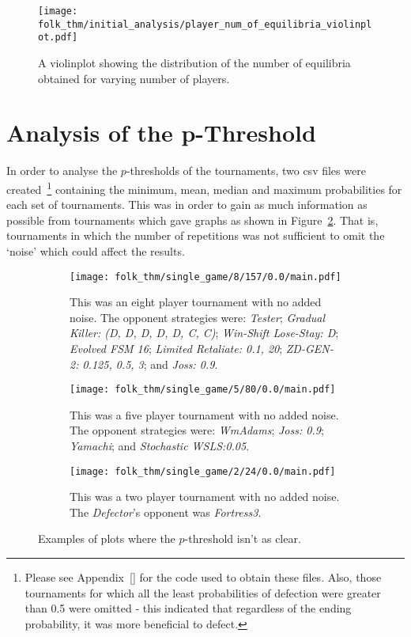 \begin{figure}      
    \centering
    \texttt{[image: folk\_thm/initial\_analysis/player\_num\_of\_equilibria\_violinplot.pdf]}
    \caption{A violinplot showing the distribution of the number of equilibria obtained for varying number of players.}\label{fig:NE_violinplot}
\end{figure}



\section{Analysis of the p-Threshold}\label{sec:Analysis_of_the_p-Threshold}
In order to analyse the \(p\)-thresholds of the tournaments, two csv files were
created~\footnote{Please see Appendix~\ref{} for the code used to obtain these
files. Also, those tournaments for which all the least probabilities of
defection were greater than 0.5 were omitted - this indicated that regardless of
the ending probability, it was more beneficial to defect.} containing the
minimum, mean, median and maximum probabilities for each set of tournaments.
This was in order to gain as much information as possible from tournaments which
gave graphs as shown in Figure~\ref{fig:less_clear}. That is, tournaments in
which the number of repetitions was not sufficient to omit the `noise' which
could affect the results.

\begin{figure}
    \begin{subfigure}{.3\textwidth}
        \centering
        \texttt{[image: folk\_thm/single\_game/8/157/0.0/main.pdf]}
        \caption{This was an eight player tournament with no added noise. The opponent strategies were: \textit{Tester}; \textit{Gradual Killer: (D, D, D, D, D, C, C)}; \textit{Win-Shift Lose-Stay: D}; \textit{Evolved FSM 16}; \textit{Limited Retaliate: 0.1, 20}; \textit{ZD-GEN-2: 0.125, 0.5, 3}; and \textit{Joss: 0.9}.}
    \end{subfigure}
    \begin{subfigure}{.3\textwidth}
        \centering
        \texttt{[image: folk\_thm/single\_game/5/80/0.0/main.pdf]}
        \caption{This was a five player tournament with no added noise. The opponent strategies were: \textit{WmAdams}; \textit{Joss: 0.9}; \textit{Yamachi}; and \textit{Stochastic WSLS:\@ 0.05}.}
    \end{subfigure}
    \begin{subfigure}{.3\textwidth}
        \centering
        \texttt{[image: folk\_thm/single\_game/2/24/0.0/main.pdf]}
        \caption{This was a two player tournament with no added noise. The \textit{Defector}'s opponent was \textit{Fortress3}.}
    \end{subfigure}
    \caption{Examples of plots where the \(p\)-threshold isn't as clear.}\label{fig:less_clear}
\end{figure}

